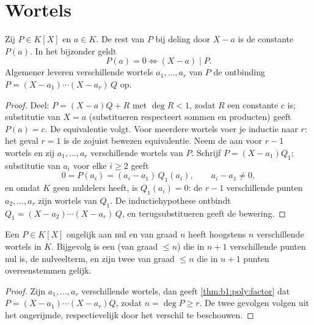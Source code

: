 \section{Wortels}

\begin{theorem}[Factorstelling]\label{thm:b1:poly:factor}
Zij $P \in K[X]$ en $a \in K$. De rest van $P$ bij deling door $X - a$ is
de constante $P(a)$. In het bijzonder geldt
\[
P(a) = 0 \iff (X - a) \mid P .
\]
Algemener leveren verschillende wortels $a_1, \dots, a_r$ van $P$ de
ontbinding $P = (X - a_1)\cdots(X - a_r)\, Q$ op.
\end{theorem}

\begin{proof}
Deel: $P = (X - a) Q + R$ met $\deg R < 1$, zodat $R$ een constante $c$
is; substitutie van $X = a$ (substitueren respecteert sommen en producten)
geeft $P(a) = c$. De equivalentie volgt. Voor meerdere wortels voer je
inductie naar $r$: het geval $r = 1$ is de zojuist bewezen equivalentie.
Neem de  aan voor $r - 1$ wortels en zij $a_1, \dots, a_r$
verschillende wortels van $P$. Schrijf $P = (X - a_1)Q_1$; substitutie van
$a_i$ voor elke $i \geq 2$ geeft
\[
0 = P(a_i) = (a_i - a_1)\,Q_1(a_i),
\qquad a_i - a_1 \neq 0 ,
\]
en omdat $K$ geen nuldelers heeft, is $Q_1(a_i) = 0$: de $r - 1$
verschillende punten $a_2, \dots, a_r$ zijn wortels van $Q_1$. De
inductiehypothese ontbindt $Q_1 = (X - a_2)\cdots(X - a_r)\,Q$, en
terugsubstitueren geeft de bewering.
\end{proof}

\begin{corollary}\label{cor:b1:poly:nroots}
Een $P \in K[X]$ ongelijk aan nul en van graad $n$ heeft hoogstens $n$
verschillende wortels in $K$. Bijgevolg is een  (van graad $\leq
n$) die in $n + 1$ verschillende punten nul is, de nulveelterm, en zijn
twee  van graad $\leq n$ die in $n+1$ punten overeenstemmen
gelijk.
\end{corollary}

\begin{proof}
Zijn $a_1, \dots, a_r$ verschillende wortels, dan geeft
\cref{thm:b1:poly:factor} dat $P = (X-a_1)\cdots(X-a_r) Q$, zodat $n =
\deg P \geq r$. De twee gevolgen volgen uit het ongerijmde,
respectievelijk door het verschil te beschouwen.
\end{proof}

